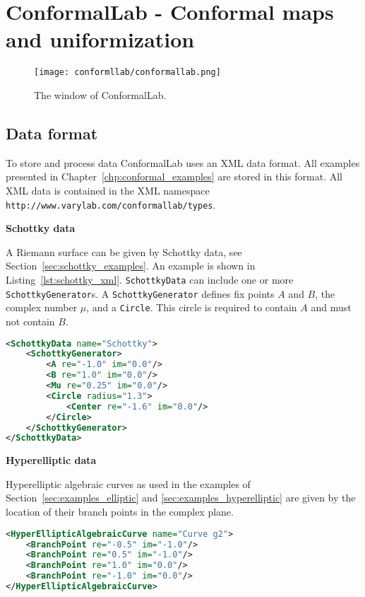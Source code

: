 \documentclass[Thesis.tex]{subfiles}
\begin{document}
\chapter{{\sc ConformalLab} - Conformal maps and uniformization}
\label{chp:conformallab}

\begin{figure}
\centering
\texttt{[image: conformllab/conformallab.png]}
\caption{The window of {\sc ConformalLab}.}
\label{fig:conformal_main}
\end{figure}

\section{Data format}
\label{sec:conformal_data}
To store and process data {\sc ConformalLab} uses an {\sc XML} data format.
All examples presented in Chapter~\ref{chp:conformal_examples} are stored
in this format. 
All XML data is contained in the XML namespace 
{\tt http://www.varylab.com/conformallab/types}.


{\bf Schottky data} 

A Riemann surface can be given by Schottky data, see Section~\ref{sec:schottky_examples}. An example is shown in Listing~\ref{lst:schottky_xml}. {\tt SchottkyData} can include one or more {\tt SchottkyGenerator}s. A {\tt SchottkyGenerator} defines fix points $A$ and $B$, the complex number $\mu$, and a {\tt Circle}. This circle is required to contain $A$ and must not contain $B$.

\begin{lstlisting}[label=lst:schottky_xml, caption={A torus given by schotty data}, numbers=none, language=XML, captionpos=b]
<SchottkyData name="Schottky">
	<SchottkyGenerator>
		<A re="-1.0" im="0.0"/>
		<B re="1.0" im="0.0"/>
		<Mu re="0.25" im="0.0"/>
		<Circle radius="1.3">
			<Center re="-1.6" im="0.0"/>
		</Circle>
	</SchottkyGenerator>
</SchottkyData>
\end{lstlisting}

{\bf Hyperelliptic data} 

Hyperelliptic algebraic curves as used in the examples of Section~\ref{sec:examples_elliptic} and \ref{sec:examples_hyperelliptic} are given by the location of their branch points in the complex plane.

\begin{lstlisting}[label=lst:hyperelliptic_xml, caption={A torus given as hyperelliptic data}, numbers=none, language=XML, captionpos=b]
<HyperEllipticAlgebraicCurve name="Curve g2">
	<BranchPoint re="-0.5" im="-1.0"/>
	<BranchPoint re="0.5" im="-1.0"/>
	<BranchPoint re="1.0" im="0.0"/>
	<BranchPoint re="-1.0" im="0.0"/>
</HyperEllipticAlgebraicCurve>
\end{lstlisting}
\end{document}
